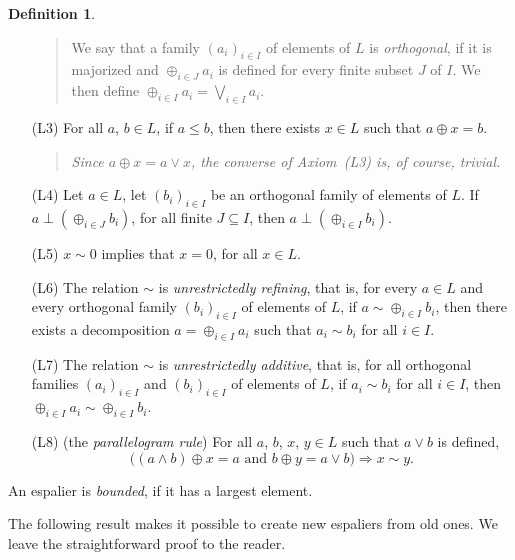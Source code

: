 \documentclass[psamsfonts,reqno]{memo-l}
\theoremstyle{plain}
\theoremstyle{definition}
\newtheorem{definition}[lemma]{Definition}
\theoremstyle{remark}
\numberwithin{equation}{section}
\newcommand{\famm}[2]{(#1)_{#2}}
\begin{document}
\begin{definition}
\begin{itemize}
\begin{quote}
We say that a family $\famm{a_i}{i\in I}$ of elements of $L$
is \emph{orthogonal}, if it is majorized and
$\oplus_{i\in J}a_i$ is defined for every finite subset $J$ of $I$. We then
define $\oplus_{i\in I}a_i=\bigvee_{i\in I}a_i$.
\end{quote}

\smallskip
\item[(L3)] For all $a$, $b\in L$, if $a\leq b$, then there exists $x\in L$
such that $a\oplus x=b$.

\begin{quote}
\em Since $a\oplus x=a\vee x$, the converse of Axiom~\textup{(L3)} is, of
course, trivial.
\end{quote}

\item[(L4)] Let $a\in L$, let $\famm{b_i}{i\in I}$ be an orthogonal family of
elements of $L$. If $a\perp(\oplus_{i\in J}b_i)$, for all finite
$J\subseteq I$, then $a\perp(\oplus_{i\in I}b_i)$.

\item[(L5)] $x\sim 0$ implies that $x=0$, for all $x\in L$.

\item[(L6)] The relation $\sim$ is \emph{unrestrictedly refining},
 that is,
for every $a\in L$ and every orthogonal family $\famm{b_i}{i\in I}$ of
elements of $L$, if $a\sim\oplus_{i\in I}b_i$, then there exists a
decomposition $a=\oplus_{i\in I}a_i$ such that $a_i\sim b_i$ for all $i\in I$.

\item[(L7)] The relation $\sim$ is \emph{unrestrictedly additive},
 that is,
for all orthogonal families $\famm{a_i}{i\in I}$ and $\famm{b_i}{i\in I}$ of
elements of $L$, if $a_i\sim b_i$ for all $i\in I$, then
$\oplus_{i\in I}a_i\sim\oplus_{i\in I}b_i$.

\item[(L8)] (the \emph{parallelogram rule})
For all $a$, $b$, $x$, $y\in L$ such that $a\vee b$ is defined,
   \[
   \bigl((a\wedge b)\oplus x=a\text{ and }b\oplus y=a\vee b\bigr)
   \Longrightarrow x\sim y.
   \]
\end{itemize}
An espalier is \emph{bounded}, if it has a
largest element.
\end{definition}

The following result makes it possible to create new espaliers from old ones.
We leave the straightforward proof to the reader.
\end{document}
